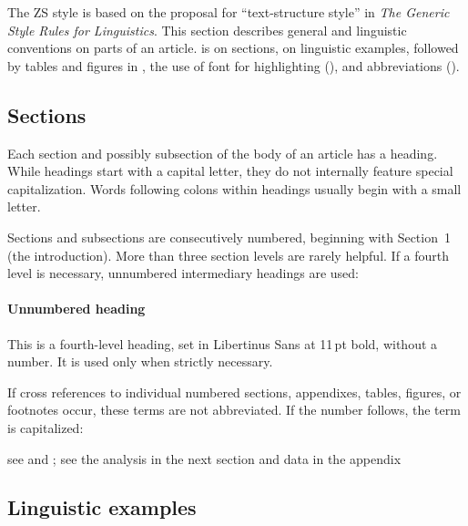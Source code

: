 \documentclass{zsarticle}
\begin{document}
The ZS style is based on the proposal for \enquote{text-structure style} in \textit{The Generic Style Rules for Linguistics}. This section describes general and linguistic conventions on parts of an article.  is on sections,  on linguistic examples, followed by tables and figures in , the use of font for highlighting (), and abbreviations ().

\subsection{Sections}\label{sec:sections}

Each section and possibly subsection of the body of an article has a heading. While headings start with a capital letter, they do not internally feature special capitalization. Words following colons within headings usually begin with a small letter.

Sections and subsections are consecutively numbered, beginning with Section~1 (the introduction). More than three section levels are rarely helpful. If a fourth level is necessary, unnumbered intermediary headings are used:

\paragraph{Unnumbered heading} This is a fourth-level heading, set in Libertinus Sans at 11\,pt bold, without a number. It is used only when strictly necessary.

If cross references to individual numbered sections, appendixes, tables, figures, or footnotes occur, these terms are not abbreviated. If the number follows, the term is capitalized:

\begin{zsquote}
see  and ; see the analysis in the next section and data in the appendix
\end{zsquote}

\subsection{Linguistic examples}\label{sec:examples}
\end{document}
